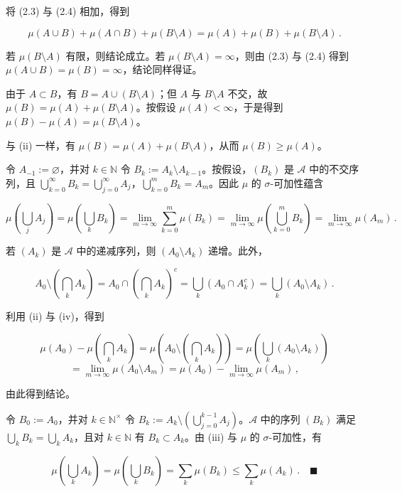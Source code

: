 \begin{proposition}
\begin{subitems}
将 (2.3) 与 (2.4) 相加，得到

\[
\mu(A \cup B) + \mu(A \cap B) + \mu(B \setminus A) = \mu(A) + \mu(B) + \mu(B \setminus A)\,.
\]

若 $ \mu(B \setminus A) $ 有限，则结论成立。若 $ \mu(B \setminus A) = \infty $，则由 (2.3) 与 (2.4) 得到 $ \mu(A \cup B) = \mu(B) = \infty $，结论同样得证。

\end{subitems}

\begin{subitems}
\item[（ii）]

由于 $ A \subset B $，有 $ B = A \cup (B \setminus A) $；但 $ A $ 与 $ B \setminus A $ 不交，故 $ \mu(B) = \mu(A) + \mu(B \setminus A) $。按假设 $ \mu(A) < \infty $，于是得到 $ \mu(B) - \mu(A) = \mu(B \setminus A) $。

\item[（iii）]

与 (ii) 一样，有 $ \mu(B) = \mu(A) + \mu(B \setminus A) $，从而 $ \mu(B) \ge \mu(A) $。

\item[（iv）]

令 $ A_{-1} := \varnothing $，并对 $ k \in \mathbb{N} $ 令 $ B_k := A_k \setminus A_{k-1} $。按假设，$ (B_k) $ 是 $ \mathcal{A} $ 中的不交序列，且 $ \bigcup_{k=0}^{\infty} B_k = \bigcup_{j=0}^{\infty} A_j $，$ \bigcup_{k=0}^{m} B_k = A_m $。因此 $ \mu $ 的 $ \sigma $-可加性蕴含

\[
\mu\left(\bigcup_j A_j\right) = \mu\left(\bigcup_k B_k\right) = \lim_{m \to \infty} \sum_{k=0}^{m} \mu(B_k) = \lim_{m \to \infty} \mu\left(\bigcup_{k=0}^{m} B_k\right) = \lim_{m \to \infty} \mu(A_m)\,.
\]
\item[（v）]

若 $ (A_k) $ 是 $ \mathcal{A} $ 中的递减序列，则 $ (A_0 \setminus A_k) $ 递增。此外，

\[
A_0 \setminus \left(\bigcap_k A_k\right) = A_0 \cap \left(\bigcap_k A_k\right)^c = \bigcup_k \left(A_0 \cap A_k^c\right) = \bigcup_k (A_0 \setminus A_k)\,.
\]

利用 (ii) 与 (iv)，得到

\[
\mu(A_0) - \mu\left(\bigcap_k A_k\right) = \mu\left(A_0 \setminus \left(\bigcap_k A_k\right)\right) = \mu\left(\bigcup_k (A_0 \setminus A_k)\right)
\]
\[
= \lim_{m \to \infty} \mu(A_0 \setminus A_m) = \mu(A_0) - \lim_{m \to \infty} \mu(A_m)\,,
\]

由此得到结论。

\item[（vi）]

令 $ B_0 := A_0 $，并对 $ k \in \mathbb{N}^{\times} $ 令 $ B_k := A_k \setminus \left(\bigcup_{j=0}^{k-1} A_j\right) $。$ \mathcal{A} $ 中的序列 $ (B_k) $ 满足 $ \bigcup_k B_k = \bigcup_k A_k $，且对 $ k \in \mathbb{N} $ 有 $ B_k \subset A_k $。由 (iii) 与 $ \mu $ 的 $ \sigma $-可加性，有

\[
\mu\left(\bigcup_k A_k\right) = \mu\left(\bigcup_k B_k\right) = \sum_k \mu(B_k) \le \sum_k \mu(A_k)\,.\quad\blacksquare
\]
\end{subitems}

\end{proposition}

